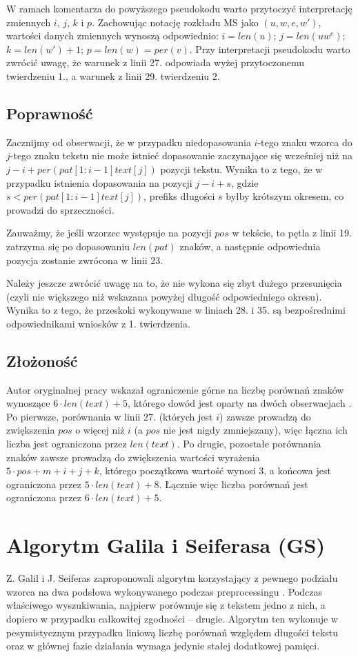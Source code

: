 \newpage
W ramach komentarza do powyższego pseudokodu warto przytoczyć interpretację zmiennych $i$, $j$, $k$ i $p$. Zachowując notację rozkładu MS jako $(u, w, e, w')$, wartości danych zmiennych wynoszą odpowiednio: $i=len(u)$; $j=len(uw^{e})$; $k=len(w')+1$; $p=len(w)=per(v)$. Przy interpretacji pseudokodu warto zwrócić uwagę, że warunek z linii 27. odpowiada wyżej przytoczonemu twierdzeniu 1., a warunek z linii 29. twierdzeniu 2.

\subsection{Poprawność}
Zacznijmy od obserwacji, że w przypadku niedopasowania $i$-tego znaku wzorca do $j$-tego znaku tekstu nie może istnieć dopasowanie zaczynające się wcześniej niż na $j-i+per(pat[1:i-1]text[j])$ pozycji tekstu. Wynika to z tego, że w przypadku istnienia dopasowania na pozycji $j-i+s$, gdzie $s < per(pat[1:i-1]text[j])$, prefiks długości $s$ byłby krótszym okresem, co prowadzi do sprzeczności.

Zauważmy, że jeśli wzorzec występuje na pozycji $pos$ w tekście, to pętla z linii 19. zatrzyma się po dopasowaniu $len(pat)$ znaków, a następnie odpowiednia pozycja zostanie zwrócona w linii 23. 

Należy jeszcze zwrócić uwagę na to, że nie wykona się zbyt dużego przesunięcia (czyli nie większego niż wskazana powyżej długość odpowiedniego okresu). Wynika to z tego, że przeskoki wykonywane w liniach 28. i 35. są bezpośrednimi odpowiednikami wniosków z 1. twierdzenia.

\subsection{Złożoność}
Autor oryginalnej pracy wskazał ograniczenie górne na liczbę porównań znaków wynoszące $6 \cdot len(text) + 5$, którego dowód jest oparty na dwóch obserwacjach \cite{Cr-or}. Po pierwsze, porównania w linii 27. (których jest $i$) zawsze prowadzą do zwiększenia $pos$ o więcej niż $i$ (a $pos$ nie jest nigdy zmniejszany), więc łączna ich liczba jest ograniczona przez $len(text)$. Po drugie, pozostałe porównania znaków zawsze prowadzą do zwiększenia wartości wyrażenia $5 \cdot pos + m + i + j + k$, którego początkowa wartość wynosi $3$, a końcowa jest ograniczona przez $5 \cdot len(text) + 8$. Łącznie więc liczba porównań jest ograniczona przez $6 \cdot len(text) + 5$.

\newpage
\section{Algorytm Galila i Seiferasa (GS)}
Z. Galil i J. Seiferas zaproponowali algorytm korzystający z pewnego podziału wzorca na dwa podsłowa wykonywanego podczas preprocessingu \cite{GS}. Podczas właściwego wyszukiwania, najpierw porównuje się z tekstem jedno z nich, a dopiero w przypadku całkowitej zgodności -- drugie. Algorytm ten wykonuje w pesymistycznym przypadku liniową liczbę porównań względem długości tekstu oraz w głównej fazie działania wymaga jedynie stałej dodatkowej pamięci.


